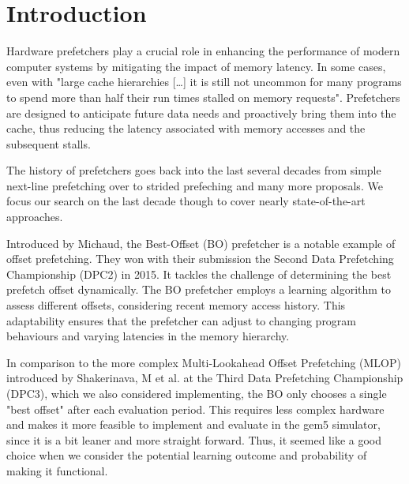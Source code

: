 \documentclass[conference]{IEEEtran}
\begin{document}
\section{Introduction} %

Hardware prefetchers play a crucial role in enhancing the performance of modern computer systems by mitigating the impact of memory latency.
In some cases, even with "large cache hierarchies [\dots] it is still not uncommon for many programs to spend more than half their run times stalled on memory requests"\cite{Background}.
Prefetchers are designed to anticipate future data needs and proactively bring them into the cache, thus reducing the latency associated with memory accesses and the subsequent stalls.

The history of prefetchers goes back into the last several decades from simple next-line prefetching  over to strided prefeching \cite{wiel_lilja_2000_data_prefetch_mechanisms} and many more proposals.
We focus our search on the last decade though to cover nearly state-of-the-art approaches.

Introduced by Michaud\cite{BOP_2016}, the Best-Offset (BO) prefetcher is a notable example of offset prefetching.
They won with their submission \cite{BOP_2015} the Second Data Prefetching Championship (DPC2) in 2015.
It tackles the challenge of determining the best prefetch offset dynamically. The BO prefetcher employs a learning algorithm to assess different offsets, considering recent memory access history. This adaptability ensures that the prefetcher can adjust to changing program behaviours and varying latencies in the memory hierarchy.

In comparison to the more complex Multi-Lookahead Offset Prefetching (MLOP)\cite{Multi-Lookahead} introduced by Shakerinava, M et al. at the Third Data Prefetching Championship (DPC3), which we also considered implementing, the BO only chooses a single "best offset" after each evaluation period.
This requires less complex hardware and makes it more feasible to implement and evaluate in the gem5 simulator,
since it is a bit leaner and more straight forward.
Thus, it seemed like a good choice when we consider the potential learning outcome and probability of making it functional.
\end{document}
